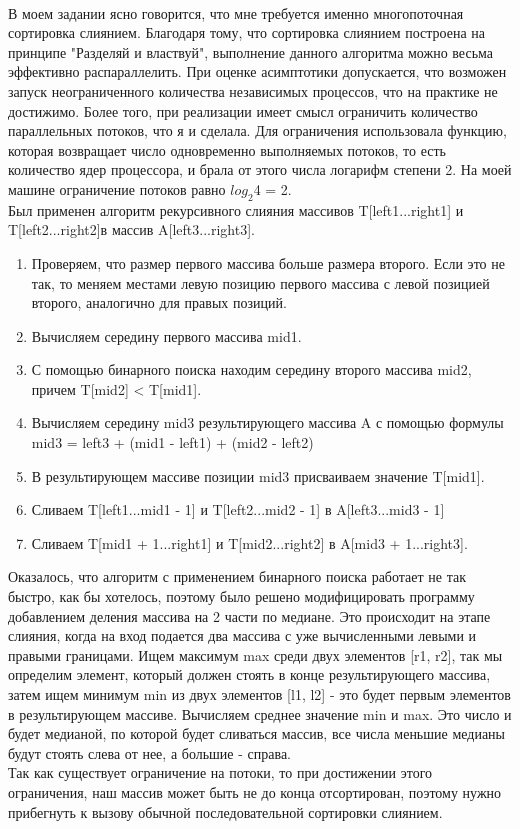 \\В моем задании ясно говорится, что мне требуется именно многопоточная сортировка слиянием. Благодаря тому, что сортировка слиянием построена на принципе "Разделяй и властвуй", выполнение данного алгоритма можно весьма эффективно распараллелить. При оценке асимптотики допускается, что возможен запуск неограниченного количества независимых процессов, что на практике не достижимо. Более того, при реализации имеет смысл ограничить количество параллельных потоков, что я и сделала. Для ограничения использовала функцию, которая возвращает число одновременно выполняемых потоков, то есть количество ядер процессора, и брала от этого числа логарифм степени 2. На моей машине ограничение потоков равно $log_{2}$4 = 2.
\\Был применен алгоритм рекурсивного слияния массивов T[left1...right1] и T[left2...right2]в массив A[left3...right3].
\begin{enumerate}
    \item Проверяем, что размер первого массива больше размера второго. Если это не так, то меняем местами левую позицию первого массива с левой позицией второго, аналогично для правых позиций.
    \item Вычисляем середину первого массива mid1.
    \item С помощью бинарного поиска находим середину второго массива mid2, причем T[mid2] < T[mid1].
    \item Вычисляем середину mid3 результирующего массива A с помощью формулы mid3 = left3 + (mid1 - left1) + (mid2 - left2)
    \item В результирующем массиве позиции mid3 присваиваем значение T[mid1].
    \item Сливаем T[left1...mid1 - 1] и T[left2...mid2 - 1] в A[left3...mid3 - 1]
    \item Сливаем T[mid1 + 1...right1] и T[mid2...right2] в A[mid3 + 1...right3]. 
\end{enumerate}
Оказалось, что алгоритм с применением бинарного поиска работает не так быстро, как бы хотелось, поэтому было решено модифицировать программу добавлением деления массива на 2 части по медиане. Это происходит на этапе слияния, когда на вход подается два массива с уже вычисленными левыми и правыми границами. Ищем максимум max среди двух элементов [r1, r2], так мы определим элемент, который должен стоять в конце результирующего массива, затем ищем минимум min из двух элементов [l1, l2] - это будет первым элементов в результирующем массиве. Вычисляем среднее значение min и max. Это число и будет медианой, по которой будет сливаться массив, все числа меньшие медианы будут стоять слева от нее, а большие - справа.
\\Так как существует ограничение на потоки, то при достижении этого ограничения, наш массив может быть не до конца отсортирован, поэтому нужно прибегнуть к вызову обычной последовательной сортировки слиянием.

